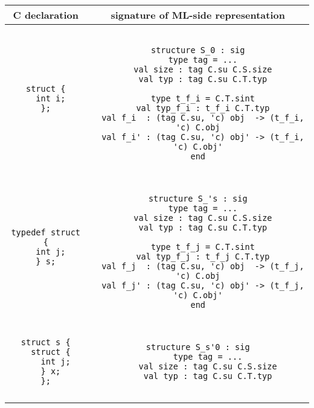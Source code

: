 \documentclass[titlepage,letterpaper]{article}
\begin{document}
\begin{small}
\begin{center}
\begin{tabular}{c|c}
C declaration & signature of ML-side representation \\ \hline\hline
\begin{minipage}{2in}
\begin{verbatim}
struct {
  int i;
};
\end{verbatim}
\end{minipage}
&
\begin{minipage}{4in}
\begin{verbatim}

structure S_0 : sig
  type tag = ...
  val size : tag C.su C.S.size
  val typ : tag C.su C.T.typ

  type t_f_i = C.T.sint
  val typ_f_i : t_f_i C.T.typ
  val f_i  : (tag C.su, 'c) obj  -> (t_f_i, 'c) C.obj
  val f_i' : (tag C.su, 'c) obj' -> (t_f_i, 'c) C.obj'
end

\end{verbatim}
\end{minipage}
\\ \hline
\begin{minipage}{2in}
\begin{verbatim}
typedef struct {
  int j;
} s;
\end{verbatim}
\end{minipage}
&
\begin{minipage}{4in}
\begin{verbatim}

structure S_'s : sig
  type tag = ...
  val size : tag C.su C.S.size
  val typ : tag C.su C.T.typ

  type t_f_j = C.T.sint
  val typ_f_j : t_f_j C.T.typ
  val f_j  : (tag C.su, 'c) obj  -> (t_f_j, 'c) C.obj
  val f_j' : (tag C.su, 'c) obj' -> (t_f_j, 'c) C.obj'
end

\end{verbatim}
\end{minipage}
\\ \hline
\begin{minipage}{2in}
\begin{verbatim}
struct s {
  struct {
    int j;
  } x;
};
\end{verbatim}
\end{minipage}
&
\begin{minipage}{4in}
\begin{verbatim}

structure S_s'0 : sig
    type tag = ...
    val size : tag C.su C.S.size
    val typ : tag C.su C.T.typ


\end{verbatim}
\end{minipage}
\end{tabular}
\end{center}
\end{small}
\end{document}
